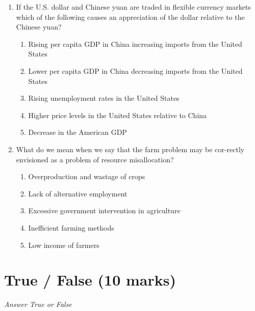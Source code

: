 \documentclass[12pt]{article}
\begin{document}
\begin{enumerate}[label=\arabic*.]
\begin{enumerate}[label=(\alph*)]
    \item The price level rises but real GDP falls.
\end{enumerate}
\item If the U.S. dollar and Chinese yuan are traded in flexible currency markets which of the following causes an appreciation of the dollar relative to the Chinese yuan?
\begin{enumerate}[label=(\alph*)]
    \item Rising per capita GDP in China increasing imports from the United States
    \item Lower per capita GDP in China decreasing imports from the United States
    \item Rising unemployment rates in the United States
    \item Higher price levels in the United States relative to China
    \item Decrease in the American GDP
\end{enumerate}
\item What do we mean when we say that the farm problem may be cor-rectly envisioned as a problem of resource misallocation?
\begin{enumerate}[label=(\alph*)]
    \item Overproduction and wastage of crops
    \item Lack of alternative employment
    \item Excessive government intervention in agriculture
    \item Inefficient farming methods
    \item Low income of farmers
\end{enumerate}
\end{enumerate}

\section*{True / False (10 marks)}
\textit{Answer True or False}
\end{document}
